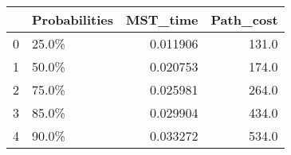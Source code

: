 \begin{tabular}{llrr}
\toprule
{} & Probabilities &  MST\_time &  Path\_cost \\
\midrule
0 &         25.0\% &  0.011906 &      131.0 \\
1 &         50.0\% &  0.020753 &      174.0 \\
2 &         75.0\% &  0.025981 &      264.0 \\
3 &         85.0\% &  0.029904 &      434.0 \\
4 &         90.0\% &  0.033272 &      534.0 \\
\bottomrule
\end{tabular}
